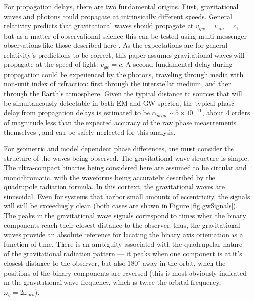 \documentclass[preprint2]{aastex}
\begin{document}
For propagation delays, there are two fundamental origins.  First,
gravitational waves and photons could propagate at intrinsically
different speeds.  General relativity predicts that gravitational
waves should propagate at $v_{gw} = v_{em} = c$, but as a matter of
observational science this can be tested using multi-messenger
observations like those described here \citep{hazbounLarson2013}.  As
the expectations are for general relativity's predictions to be
correct, this paper assumes gravitational waves will propagate at the
speed of light: $v_{gw} = c$.  A second fundamental delay during
propagation could be experienced by the photons, traveling through
media with non-unit index of refraction: first through the
interstellar medium, and then through the Earth's atmosphere.  Given
the typical distance to sources that will be simultaneously detectable
in both EM and GW spectra, the typical phase delay from propagation
delays is estimated to be $\alpha_{prop} \sim 5 \times 10^{-11}$,
about 4 orders of magnitude less than the expected accuracy of the raw
phase measurements themselves \citep{gravitonSLL}, and can be safely
neglected for this analysis.

For geometric and model dependent phase differences, one must consider
the structure of the waves being observed.  The gravitational wave
structure is simple.  The ultra-compact binaries being considered here
are assumed to be circular and monochromatic, with the waveforms being
accurately described by the quadrupole radiation formula.  In this
context, the gravitational waves are sinusoidal.  Even for systems
that harbor small amounts of eccentricity, the signals will still be
exceedingly clean (both cases are shown in Figure
\ref{fig.gwSignals}).  The peaks in the gravitational wave signals
correspond to times when the binary components reach their closest distance to the observer; thus, the gravitational waves
provide an absolute reference for locating the binary axis orientation
as a function of time.  There is an ambiguity associated with the
quadrupolar nature of the gravitational radiation pattern --- it peaks
when one component is at it's closest distance to the observer, but also $180^{\circ}$ away in the orbit, when
the positions of the binary components are reversed (this is most
obviously indicated in the gravitational wave frequency, which is
twice the orbital frequency, $\omega_{g} = 2 \omega_{orb}$).
\end{document}
